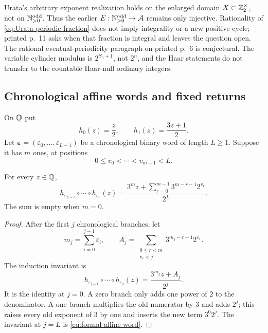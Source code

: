\begin{nonclaim}
Urata's arbitrary exponent realization holds on the enlarged domain
$X\subset\mathbb{Z}_{2}^{\times}$, not on $\mathbb{N}_{>0}^{\mathrm{odd}}$.  Thus the earlier
$E:\mathbb{N}_{>0}^{\mathrm{odd}}\to\mathcal A$ remains only injective.  Rationality of
\eqref{eq:Urata-periodic-fraction} does not imply integrality or a new positive
cycle; printed p.~11 asks when that fraction is integral and leaves the
question open.  The rational eventual-periodicity paragraph on printed p.~6
is conjectural.  The variable cylinder modulus is $2^{S_n+1}$, not $2^n$, and
the Haar statements do not transfer to the countable Haar-null ordinary
integers.
\end{nonclaim}

\subsection{Chronological affine words and fixed returns}

On $\mathbb{Q}$ put
\[
 h_0(z)=\frac z2,
 \qquad
 h_1(z)=\frac{3z+1}{2}.
\]
Let $\boldsymbol\varepsilon=(\varepsilon_0,\ldots,\varepsilon_{L-1})$ be a
chronological binary word of length $L\geq1$.  Suppose it has $m$ ones, at
positions
\[
 0\leq v_0<\cdots<v_{m-1}<L.
\]

\begin{proposition}
\label{prop:formal-chronological-composition}
For every $z\in\mathbb{Q}$,
\begin{equation}
\label{eq:formal-affine-word}
 h_{\varepsilon_{L-1}}\circ\cdots\circ h_{\varepsilon_0}(z)
 =\frac{3^m z+
 \displaystyle\sum_{r=0}^{m-1}3^{m-r-1}2^{v_r}}{2^L}.
\end{equation}
The sum is empty when $m=0$.
\end{proposition}

\begin{proof}
After the first $j$ chronological branches, let
\[
 m_j=\sum_{i=0}^{j-1}\varepsilon_i,
 \qquad
 A_j=\sum_{\substack{0\leq r<m\\v_r<j}}
       3^{m_j-r-1}2^{v_r}.
\]
The induction invariant is
\[
 h_{\varepsilon_{j-1}}\circ\cdots\circ h_{\varepsilon_0}(z)
 =\frac{3^{m_j}z+A_j}{2^j}.
\]
It is the identity at $j=0$.  A zero branch only adds one power of $2$ to
the denominator.  A one branch multiplies the old numerator by $3$ and adds
$2^j$; this raises every old exponent of $3$ by one and inserts the new term
$3^0 2^j$.  The invariant at $j=L$ is \eqref{eq:formal-affine-word}.
\end{proof}

